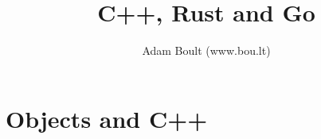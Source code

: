 \documentclass[oneside]{book}
\begin{document}
\author{Adam Boult (www.bou.lt)}
\title{C++, Rust and Go}
\maketitle

\setcounter{tocdepth}{0}
\tableofcontents




\part{Objects and C++}



\end{document}
